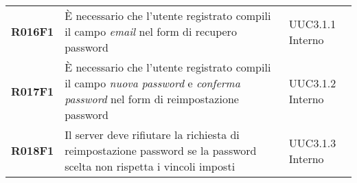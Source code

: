 \documentclass[../analisi-dei-requisiti.tex]{subfiles}
\begin{document}
\begin{longtable}[H]{>{\centering\bfseries}m{3cm} >{\centering}m{10cm} >{\centering\arraybackslash}m{3cm}}
  R016F1                               & È necessario che l'utente registrato compili il campo \textit{email} nel form di recupero password                                                                                                      & UUC3.1.1 Interno              \\
  R017F1                               & È necessario che l'utente registrato compili il campo \textit{nuova password} e \textit{conferma password} nel form di reimpostazione password                                                          & UUC3.1.2 Interno              \\
  R018F1                               & Il server deve rifiutare la richiesta di reimpostazione password se la password scelta non rispetta i vincoli imposti                                                                                   & UUC3.1.3 Interno              \\


\end{longtable}
\end{document}
